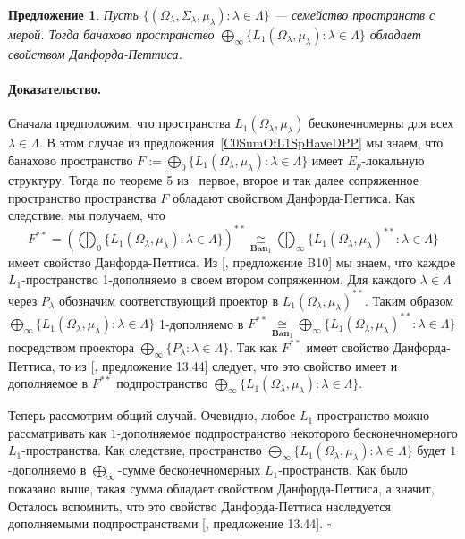 \documentclass[12pt]{article}
\newcommand{\isom}[1]{\mathop{\mathbin{\cong}}\limits_{#1}}
\newtheorem{proposition}[theorem]{Предложение}
\renewenvironment{proof}{\paragraph{Доказательство.}}{\hfill$\square$\medskip}
\begin{document}
\begin{proposition}\label{ProdOfL1SpHaveDPP} Пусть 
    $\{(\Omega_\lambda,\Sigma_\lambda,\mu_\lambda):\lambda\in\Lambda \}$ ---
    семейство пространств с мерой. Тогда банахово пространство
    $\bigoplus_\infty \{L_1(\Omega_\lambda,\mu_\lambda):\lambda\in\Lambda
        \}$ обладает свойством Данфорда-Петтиса.
\end{proposition}
\begin{proof} Сначала предположим, что пространства $L_1(\Omega_\lambda,
        \mu_\lambda)$ бесконечномерны для всех $\lambda\in\Lambda$. В этом
    случае из предложения~\ref{C0SumOfL1SpHaveDPP} мы знаем, что банахово
    пространство $F:=\bigoplus_0
        \{L_1(\Omega_\lambda,\mu_\lambda):\lambda\in\Lambda \}$ имеет
    $E_{p}$-локальную структуру. Тогда по теореме 5 из~\cite{BourgOnTheDPP}
    первое, второе и так далее сопряженное пространство пространства $F$
    обладают свойством Данфорда-Петтиса. Как следствие, мы получаем, что
    $$
        F^{**}=
            {\left(
                \bigoplus_0 
                \{L_1(\Omega_\lambda,\mu_\lambda):\lambda\in\Lambda \}
            \right)}^{**}
        \isom{\mathbf{Ban}_1}\bigoplus_\infty
        \{{L_1(\Omega_\lambda,\mu_\lambda)}^{**}:\lambda\in\Lambda \}
    $$
    имеет свойство Данфорда-Петтиса. Из [\cite{DefFloTensNorOpId}, предложение
    B10] мы знаем, что каждое $L_1$-пространство 1-дополняемо в своем втором
    сопряженном. Для каждого $\lambda\in\Lambda$ через $P_\lambda$ обозначим
    соответствующий проектор в ${L_1(\Omega_\lambda,\mu_\lambda)}^{**}$. Таким
    образом $\bigoplus_\infty
        \{L_1(\Omega_\lambda,\mu_\lambda):\lambda\in\Lambda \}$ 1-дополняемо в
    $F^{**}\isom{\mathbf{Ban}_1}
        \bigoplus_\infty 
        \{{L_1(\Omega_\lambda,\mu_\lambda)}^{**}:\lambda\in\Lambda \}$ 
    посредством проектора $\bigoplus_\infty  \{P_\lambda:\lambda\in\Lambda \}$. 
    Так как $F^{**}$ имеет свойство Данфорда-Петтиса, то из 
    [\cite{FabHabBanSpTh}, предложение 13.44] следует, что это 
    свойство имеет и дополняемое в $F^{**}$ подпространство 
    $\bigoplus_\infty \{L_1(\Omega_\lambda,\mu_\lambda):\lambda\in\Lambda \}$.

    Теперь рассмотрим общий случай. Очевидно, любое $L_1$-пространство можно
    рассматривать как $1$-дополняемое подпространство некоторого
    бесконечномерного $L_1$-пространства. Как следствие, пространство
    $\bigoplus_\infty \{L_1(\Omega_\lambda,\mu_\lambda):\lambda\in\Lambda \}$
    будет $1$-дополняемо в $\bigoplus_\infty$-сумме бесконечномерных
    $L_1$-пространств. Как было показано выше, такая сумма обладает свойством
    Данфорда-Петтиса, а значит, Осталось вспомнить, что это свойство
    Данфорда-Петтиса наследуется дополняемыми подпространствами
    [\cite{FabHabBanSpTh}, предложение 13.44].
\end{proof}
\end{document}
